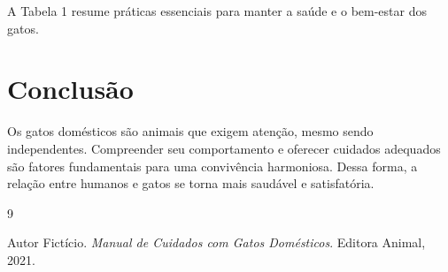\documentclass{article}
\begin{document}
A Tabela 1 resume práticas essenciais para manter a saúde e o bem-estar dos gatos.

\section{Conclusão}

Os gatos domésticos são animais que exigem atenção, mesmo sendo independentes. Compreender seu comportamento e oferecer cuidados adequados são fatores fundamentais para uma convivência harmoniosa. Dessa forma, a relação entre humanos e gatos se torna mais saudável e satisfatória.

\begin{thebibliography}{9}

Autor Fictício. \textit{Manual de Cuidados com Gatos Domésticos}. Editora Animal, 2021.

\end{thebibliography}
\end{document}
